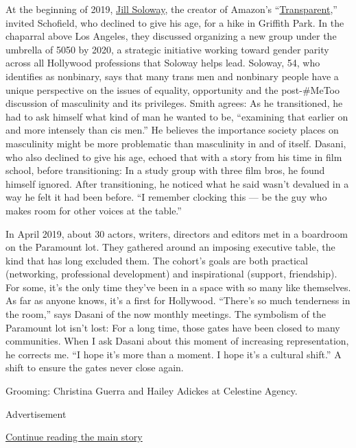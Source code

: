 At the beginning of 2019,
\href{https://www.nytimes3xbfgragh.onion/2014/08/31/magazine/can-jill-soloway-do-justice-to-the-trans-movement.html}{Jill
Soloway}, the creator of Amazon's
``\href{https://www.nytimes3xbfgragh.onion/watching/recommendations/watching-tv-transparent?auto=true}{Transparent},''
invited Schofield, who declined to give his age, for a hike in Griffith
Park. In the chaparral above Los Angeles, they discussed organizing a
new group under the umbrella of 5050 by 2020, a strategic initiative
working toward gender parity across all Hollywood professions that
Soloway helps lead. Soloway, 54, who identifies as nonbinary, says that
many trans men and nonbinary people have a unique perspective on the
issues of equality, opportunity and the post-\#MeToo discussion of
masculinity and its privileges. Smith agrees: As he transitioned, he had
to ask himself what kind of man he wanted to be, ``examining that
earlier on and more intensely than cis men.'' He believes the importance
society places on masculinity might be more problematic than masculinity
in and of itself. Dasani, who also declined to give his age, echoed that
with a story from his time in film school, before transitioning: In a
study group with three film bros, he found himself ignored. After
transitioning, he noticed what he said wasn't devalued in a way he felt
it had been before. ``I remember clocking this --- be the guy who makes
room for other voices at the table.''

In April 2019, about 30 actors, writers, directors and editors met in a
boardroom on the Paramount lot. They gathered around an imposing
executive table, the kind that has long excluded them. The cohort's
goals are both practical (networking, professional development) and
inspirational (support, friendship). For some, it's the only time
they've been in a space with so many like themselves. As far as anyone
knows, it's a first for Hollywood. ``There's so much tenderness in the
room,'' says Dasani of the now monthly meetings. The symbolism of the
Paramount lot isn't lost: For a long time, those gates have been closed
to many communities. When I ask Dasani about this moment of increasing
representation, he corrects me. ``I hope it's more than a moment. I hope
it's a cultural shift.'' A shift to ensure the gates never close again.

Grooming: Christina Guerra and Hailey Adickes at Celestine Agency.

Advertisement

\protect\hyperlink{after-bottom}{Continue reading the main story}

